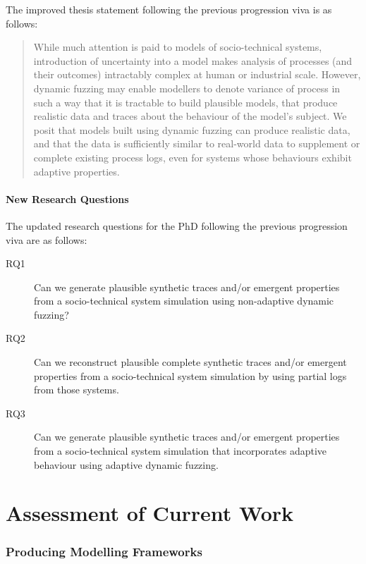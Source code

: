 \documentclass[11pt]{article}
\begin{document}
The improved thesis statement following the previous progression viva is as
follows:

\begin{quote}
While much attention is paid to models of socio-technical systems,
introduction of uncertainty into a model makes analysis of processes (and their
outcomes) intractably complex at human or industrial scale. However, dynamic
fuzzing may enable modellers to denote variance of process in such a way that it
is tractable to build plausible models, that produce realistic data and traces
about the behaviour of the model’s subject. We posit that models built using
dynamic fuzzing can produce realistic data, and that the data is sufficiently
similar to real-world data to supplement or complete existing process logs, even
for systems whose behaviours exhibit adaptive properties.
\end{quote}

\subsection{New Research Questions}
\label{sec:org11ef3e4}

The updated research questions for the PhD following the previous progression
viva are as follows:

\begin{description}
\item[RQ1] Can we generate plausible synthetic traces and/or emergent properties from a
   socio-technical system simulation using non-adaptive dynamic fuzzing?
\item[RQ2] Can we reconstruct plausible complete synthetic traces and/or emergent
   properties from a socio-technical system simulation by using partial logs
   from those systems.
\item[RQ3] Can we generate plausible synthetic traces and/or emergent properties from a
   socio-technical system simulation that incorporates adaptive behaviour using
   adaptive dynamic fuzzing.
\end{description}



\part{Assessment of Current Work}
\label{part:following_work}




\section{Producing Modelling Frameworks}
\label{sec:orgd228a83}
\end{document}
